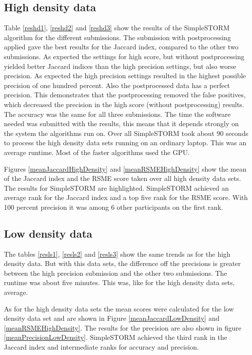 \subsection{High density data}
Table \ref{reshd1}, \ref{reshd2} and \ref{reshd3} show the results of the SimpleSTORM algorithm for the different submissions. The submission with postprocessing applied gave the best results for the Jaccard index, compared to the other two submissions. As expected the settings for high score, but without postprocessing yielded better Jaccard indices than the high precision settings, but also worse precision. As expected the high precision settings resulted in the highest possible precision of one hundred percent. Also the postprocessed data has a perfect precision. This demonstrates that the postprocessing removed the false positives, which decreased the precision in the high score (without postprocessing) results. The accuracy was the same for all three submissions.\newline
The time the software needed was submitted with the results, this means that it depends strongly on the system the algorithms run on. Over all SimpleSTORM took about 90 seconds to process the high density data sets running on an ordinary laptop. This was an average runtime. Most of the faster algorithms used the GPU.

Figures \ref{meanJaccardHighDensity} and \ref{meanRSMEHighDensity} show the mean of the Jaccard index and the RSME score taken over all high density data sets. The results for SimpleSTORM are highlighted. SimpleSTORM achieved an average rank for the Jaccard index and a top five rank for the RSME score. With 100 percent precision it was among 6 other participants on the first rank.




\subsection{Low density data}
The tables \ref{resls1}, \ref{resls2} and \ref{resls3} show the same trends as for the high density data. But with this data sets, the difference off the precisions is greater between the high precision submission and the other two submissions. The runtime was about five minutes. This was, like for the high density data sets, average.



As for the high density data sets the mean scores were calculated for the low density data set and are shown in Figure \ref{meanJaccardLowDensity} and \ref{meanRSMEHighDensity}. The results for the precision are also shown in figure \ref{meanPrecisionLowDensity}. SimpleSTORM achieved the third rank in the Jaccard index and intermediate ranks for accuracy and precision.



